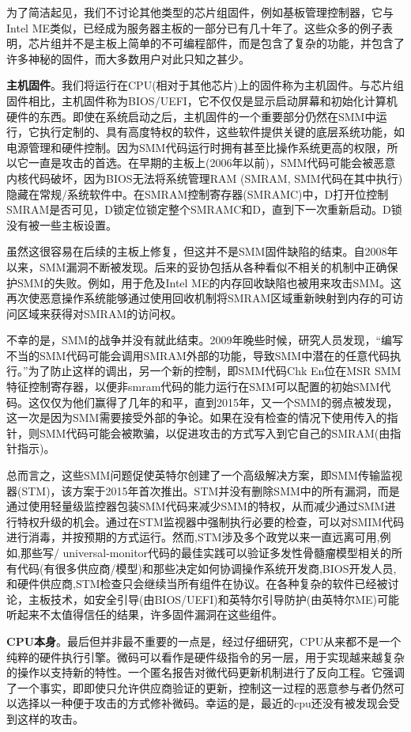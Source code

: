 为了简洁起见，我们不讨论其他类型的芯片组固件，例如基板管理控制器，它与Intel ME类似，已经成为服务器主板的一部分已有几十年了。这些众多的例子表明，芯片组并不是主板上简单的不可编程部件，而是包含了复杂的功能，并包含了许多神秘的固件，而大多数用户对此只知之甚少。

\textbf{主机固件}。我们将运行在CPU(相对于其他芯片)上的固件称为主机固件。与芯片组固件相比，主机固件称为BIOS/UEFI，它不仅仅是显示启动屏幕和初始化计算机硬件的东西。即使在系统启动之后，主机固件的一个重要部分仍然在SMM中运行，它执行定制的、具有高度特权的软件，这些软件提供关键的底层系统功能，如电源管理和硬件控制。因为SMM代码运行时拥有甚至比操作系统更高的权限，所以它一直是攻击的首选。在早期的主板上(2006年以前)，SMM代码可能会被恶意内核代码破坏，因为BIOS无法将系统管理RAM (SMRAM, SMM代码在其中执行)隐藏在常规/系统软件中。在SMRAM控制寄存器(SMRAMC)中，D打开位控制SMRAM是否可见，D锁定位锁定整个SMRAMC和D，直到下一次重新启动。D锁没有被一些主板设置。

虽然这很容易在后续的主板上修复，但这并不是SMM固件缺陷的结束。自2008年以来，SMM漏洞不断被发现。后来的妥协包括从各种看似不相关的机制中正确保护SMM的失败。例如，用于危及Intel ME的内存回收缺陷也被用来攻击SMM。这再次使恶意操作系统能够通过使用回收机制将SMRAM区域重新映射到内存的可访问区域来获得对SMRAM的访问权。

不幸的是，SMM的战争并没有就此结束。2009年晚些时候，研究人员发现，“编写不当的SMM代码可能会调用SMRAM外部的功能，导致SMM中潜在的任意代码执行。”为了防止这样的调出，另一个新的控制，即SMM代码Chk En位在MSR SMM特征控制寄存器，以便非smram代码的能力运行在SMM可以配置的初始SMM代码。这仅仅为他们赢得了几年的和平，直到2015年，又一个SMM的弱点被发现，这一次是因为SMM需要接受外部的争论。如果在没有检查的情况下使用传入的指针，则SMM代码可能会被欺骗，以促进攻击的方式写入到它自己的SMRAM(由指针指示)。

总而言之，这些SMM问题促使英特尔创建了一个高级解决方案，即SMM传输监视器(STM)，该方案于2015年首次推出。STM并没有删除SMM中的所有漏洞，而是通过使用轻量级监控器包装SMM代码来减少SMM的特权，从而减少通过SMM进行特权升级的机会。通过在STM监视器中强制执行必要的检查，可以对SMIM代码进行消毒，并按预期的方式运行。然而,STM涉及多个政党以来一直远离可用,例如,那些写/ universal-monitor代码的最佳实践可以验证多发性骨髓瘤模型相关的所有代码(有很多供应商/模型)和那些决定如何协调操作系统开发商,BIOS开发人员,和硬件供应商,STM检查只会继续当所有组件在协议。在各种复杂的软件已经被讨论，主板技术，如安全引导(由BIOS/UEFI)和英特尔引导防护(由英特尔ME)可能听起来不太值得信任的结果，许多固件漏洞在这些组件。

\textbf{CPU本身}。最后但并非最不重要的一点是，经过仔细研究，CPU从来都不是一个纯粹的硬件执行引擎。微码可以看作是硬件级指令的另一层，用于实现越来越复杂的操作以支持新的特性。一个匿名报告对微代码更新机制进行了反向工程。它强调了一个事实，即即使只允许供应商验证的更新，控制这一过程的恶意参与者仍然可以选择以一种便于攻击的方式修补微码。幸运的是，最近的cpu还没有被发现会受到这样的攻击。



